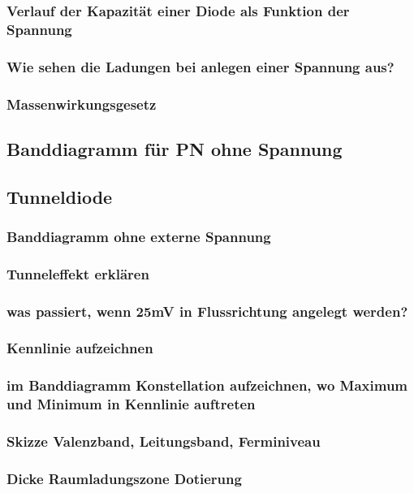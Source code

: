 \documentclass{article}
\begin{document}
    \subsubsection{Verlauf der Kapazit\"at einer Diode als Funktion der Spannung}
    \subsubsection{Wie sehen die Ladungen bei anlegen einer Spannung aus?}
    \subsubsection{Massenwirkungsgesetz}

\subsection{Banddiagramm für PN ohne Spannung}\label{k5:pnBand}
\subsection{Tunneldiode}\label{k5:tunnelDiode}
    \subsubsection{Banddiagramm ohne externe Spannung}
    \subsubsection{Tunneleffekt erklären}
    \subsubsection{was passiert, wenn 25mV in Flussrichtung angelegt werden?}
    \subsubsection{Kennlinie aufzeichnen}
    \subsubsection{im Banddiagramm Konstellation aufzeichnen, wo Maximum und Minimum in Kennlinie auftreten}
    
    \subsubsection{Skizze Valenzband, Leitungsband, Ferminiveau}
    \subsubsection{Dicke Raumladungszone Dotierung}
\end{document}

